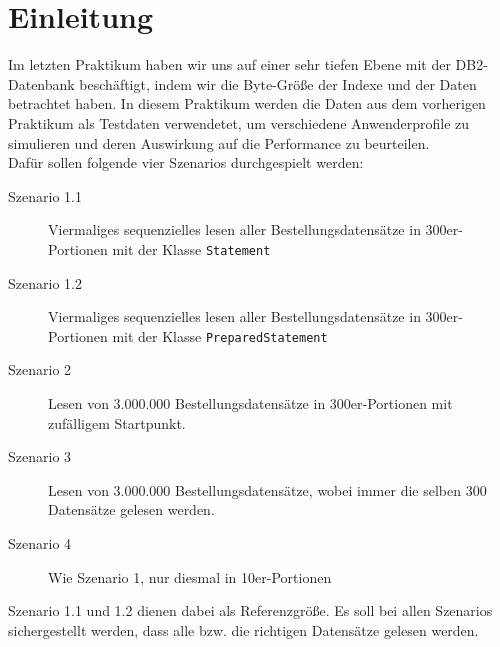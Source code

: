\chapter{Einleitung}
Im letzten Praktikum haben wir uns auf einer sehr tiefen Ebene mit der DB2-Datenbank beschäftigt, indem wir die Byte-Größe der Indexe und der Daten betrachtet haben. In diesem Praktikum werden die Daten aus dem vorherigen Praktikum als Testdaten verwendetet, um verschiedene Anwenderprofile zu simulieren und deren Auswirkung auf die Performance zu beurteilen. \\

Dafür sollen folgende vier Szenarios durchgespielt werden:
\begin{description}
\item[Szenario 1.1] Viermaliges sequenzielles lesen aller Bestellungsdatensätze in 300er-Portionen mit der Klasse \texttt{Statement}
\item[Szenario 1.2] Viermaliges sequenzielles lesen aller Bestellungsdatensätze in 300er-Portionen mit der Klasse \texttt{PreparedStatement}
\item[Szenario 2] Lesen von 3.000.000 Bestellungsdatensätze in 300er-Portionen mit zufälligem Startpunkt.
\item[Szenario 3] Lesen von 3.000.000 Bestellungsdatensätze, wobei immer die selben 300 Datensätze gelesen werden.
\item[Szenario 4] Wie Szenario 1, nur diesmal in 10er-Portionen
\end{description}

Szenario 1.1 und 1.2 dienen dabei als Referenzgröße. Es soll bei allen Szenarios sichergestellt werden, dass alle bzw. die richtigen Datensätze gelesen werden. 